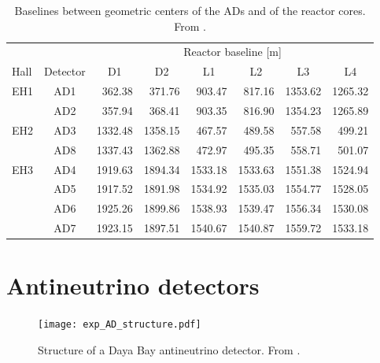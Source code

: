 \documentclass[../thesis.tex]{subfiles}
\begin{document}
\begin{table}[ht]
  \begin{tabular}{lcrrrrrr}
    \toprule
    \multicolumn{2}{c}{} & \multicolumn{6}{c}{Reactor baseline [m]} \\
    \cmidrule{3-8}
    Hall & Detector & \multicolumn{1}{c}{D1} & \multicolumn{1}{c}{D2} & \multicolumn{1}{c}{L1} & \multicolumn{1}{c}{L2} & \multicolumn{1}{c}{L3} & \multicolumn{1}{c}{L4} \\
    \midrule
    EH1  & AD1      & 362.38  & 371.76  & 903.47  & 817.16  & 1353.62 & 1265.32 \\
                         & AD2      & 357.94  & 368.41  & 903.35  & 816.90  & 1354.23 & 1265.89 \\
    EH2  & AD3      & 1332.48 & 1358.15 & 467.57  & 489.58  & 557.58  & 499.21  \\
                         & AD8      & 1337.43 & 1362.88 & 472.97  & 495.35  & 558.71  & 501.07  \\
    EH3  & AD4      & 1919.63 & 1894.34 & 1533.18 & 1533.63 & 1551.38 & 1524.94 \\
                         & AD5      & 1917.52 & 1891.98 & 1534.92 & 1535.03 & 1554.77 & 1528.05 \\
                         & AD6      & 1925.26 & 1899.86 & 1538.93 & 1539.47 & 1556.34 & 1530.08 \\
                         & AD7      & 1923.15 & 1897.51 & 1540.67 & 1540.87 & 1559.72 & 1533.18 \\
    \bottomrule
  \end{tabular}
  \caption{Baselines between geometric centers of the ADs and of the reactor
    cores. From \cite{An_2017}.}
  \label{tab:expBaselines}
\end{table}

\section{Antineutrino detectors}
\label{sec:expADs}

\begin{figure}[ht]
  \texttt{[image: exp\_AD\_structure.pdf]}
  \caption{Structure of a Daya Bay antineutrino detector. From \cite{An_2017}.}
  \label{fig:expDetector}
\end{figure}
\end{document}
